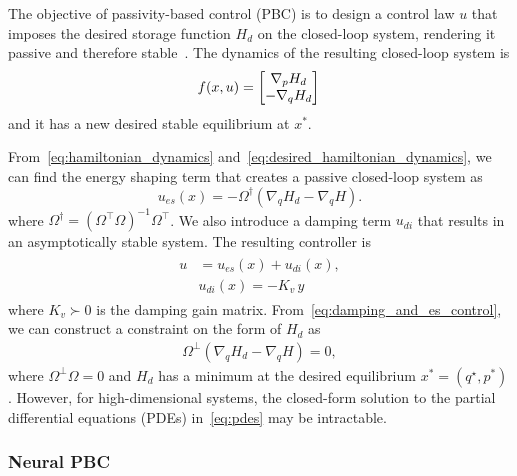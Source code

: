 The objective of passivity-based control (PBC) is to design a control law $u$
that imposes the desired storage function $H_d$ on the closed-loop system,
rendering it passive and therefore stable~\cite{van2000l2}.
%
The dynamics of the resulting closed-loop system is 
\begin{align}
  \begin{split}  
    f(x, u) &= \begin{bmatrix}\nabla_pH_d \\ -\nabla_qH_d\end{bmatrix}\, \\
  \end{split}
  \label{eq:desired_hamiltonian_dynamics}
\end{align}
\noindent and it has a new desired stable equilibrium at $x^*$.

From~\eqref{eq:hamiltonian_dynamics}
and~\eqref{eq:desired_hamiltonian_dynamics}, we can find the energy shaping term
that creates a passive closed-loop system as
%
\begin{equation}
  u_{es}(x) =  -\Omega^{\dagger} \left( \nabla_q H_d - \nabla_q H \right).
  \label{eq:esc}
\end{equation}
\noindent where $\Omega^\dagger = \left( \Omega^\top \Omega  \right)^{-1}
\Omega^\top$. We also introduce a damping term $u_{di}$ that results in an
asymptotically stable system. The resulting controller is
\begin{align}
  \begin{split} 
    u &= u_{es}(x) + u_{di}(x), \\
    &u_{di}(x) = - K_{v} \, y
  \end{split}
  \label{eq:damping_and_es_control}
\end{align}
\noindent where $K_v \succ 0$ is the damping gain matrix.
From~\eqref{eq:damping_and_es_control}, we can construct a constraint on the
form of $H_d$ as 
\begin{align}
  \Omega^\bot \left( \nabla_q H_d - \nabla_q H \right) = 0,
    \label{eq:pdes}
\end{align}
where $\Omega^\perp \Omega = 0$ and $H_d$ has a minimum at the desired
equilibrium $x^* = (q^\star, p^*)$. 
%
However, for high-dimensional systems, the closed-form solution to the partial
differential equations (PDEs) in~\eqref{eq:pdes} may be intractable. 

\subsubsection{Neural PBC}

